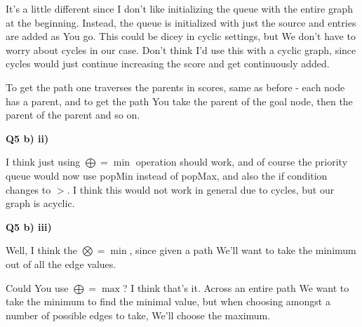 \documentclass{article}
\begin{document}
	It's a little different since I don't like initializing the queue with the entire graph at the beginning. Instead, the queue is initialized with just the source and entries are added as You go. This could be dicey in cyclic settings, but We don't have to worry about cycles in our case. Don't think I'd use this with a cyclic graph, since cycles would just continue increasing the score and get continuously added.
	
	To get the path one traverses the parents in scores, same as before - each node has a parent, and to get the path You take the parent of the goal node, then the parent of the parent and so on.
	
\textbf{Q5 b) ii)}
	
	I think just using $\bigoplus = \min$ operation should work, and of course the priority queue would now use popMin instead of popMax, and also the if condition changes to $>$. I think this would not work in general due to cycles, but our graph is acyclic. 
	
\textbf{Q5 b) iii)}

	Well, I think the $\bigotimes = \min$, since given a path We'll want to take the minimum out of all the edge values.
	
	Could You use $\bigoplus = \max$? I think that's it. Across an entire path We want to take the minimum to find the minimal value, but when choosing amongst a number of possible edges to take, We'll choose the maximum. 
	
	
	
\end{document}
